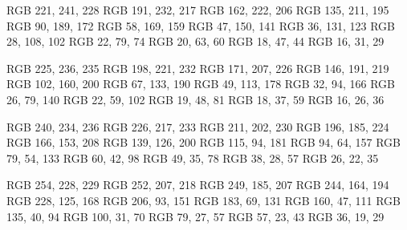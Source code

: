 \definecolor{cyan-50}  {RGB} {221, 241, 228}
\definecolor{cyan-100} {RGB} {191, 232, 217}
\definecolor{cyan-150} {RGB} {162, 222, 206}
\definecolor{cyan-200} {RGB} {135, 211, 195}
\definecolor{cyan-300} {RGB} {90, 189, 172}
\definecolor{cyan-400} {RGB} {58, 169, 159}
\definecolor{cyan-500} {RGB} {47, 150, 141}
\definecolor{cyan-600} {RGB} {36, 131, 123}
\definecolor{cyan-700} {RGB} {28, 108, 102}
\definecolor{cyan-800} {RGB} {22, 79, 74}
\definecolor{cyan-850} {RGB} {20, 63, 60}
\definecolor{cyan-900} {RGB} {18, 47, 44}
\definecolor{cyan-950} {RGB} {16, 31, 29}

\definecolor{blue-50}  {RGB} {225, 236, 235}
\definecolor{blue-100} {RGB} {198, 221, 232}
\definecolor{blue-150} {RGB} {171, 207, 226}
\definecolor{blue-200} {RGB} {146, 191, 219}
\definecolor{blue-300} {RGB} {102, 160, 200}
\definecolor{blue-400} {RGB} {67, 133, 190}
\definecolor{blue-500} {RGB} {49, 113, 178}
\definecolor{blue-600} {RGB} {32, 94, 166}
\definecolor{blue-700} {RGB} {26, 79, 140}
\definecolor{blue-800} {RGB} {22, 59, 102}
\definecolor{blue-850} {RGB} {19, 48, 81}
\definecolor{blue-900} {RGB} {18, 37, 59}
\definecolor{blue-950} {RGB} {16, 26, 36}

\definecolor{purple-50}  {RGB} {240, 234, 236}
\definecolor{purple-100} {RGB} {226, 217, 233}
\definecolor{purple-150} {RGB} {211, 202, 230}
\definecolor{purple-200} {RGB} {196, 185, 224}
\definecolor{purple-300} {RGB} {166, 153, 208}
\definecolor{purple-400} {RGB} {139, 126, 200}
\definecolor{purple-500} {RGB} {115, 94, 181}
\definecolor{purple-600} {RGB} {94, 64, 157}
\definecolor{purple-700} {RGB} {79, 54, 133}
\definecolor{purple-800} {RGB} {60, 42, 98}
\definecolor{purple-850} {RGB} {49, 35, 78}
\definecolor{purple-900} {RGB} {38, 28, 57}
\definecolor{purple-950} {RGB} {26, 22, 35}

\definecolor{magenta-50}  {RGB} {254, 228, 229}
\definecolor{magenta-100} {RGB} {252, 207, 218}
\definecolor{magenta-150} {RGB} {249, 185, 207}
\definecolor{magenta-200} {RGB} {244, 164, 194}
\definecolor{magenta-300} {RGB} {228, 125, 168}
\definecolor{magenta-400} {RGB} {206, 93, 151}
\definecolor{magenta-500} {RGB} {183, 69, 131}
\definecolor{magenta-600} {RGB} {160, 47, 111}
\definecolor{magenta-700} {RGB} {135, 40, 94}
\definecolor{magenta-800} {RGB} {100, 31, 70}
\definecolor{magenta-850} {RGB} {79, 27, 57}
\definecolor{magenta-900} {RGB} {57, 23, 43}
\definecolor{magenta-950} {RGB} {36, 19, 29}